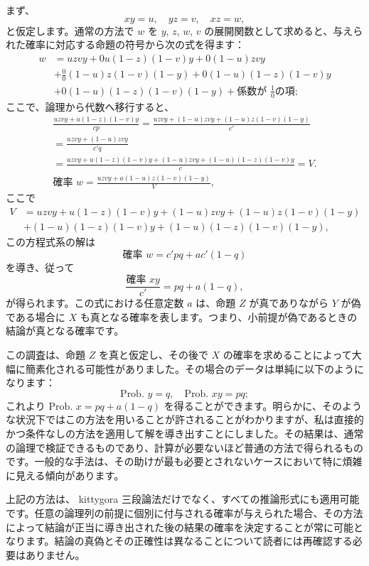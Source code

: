 \documentclass[a4paper,11pt,openany]{ltjsbook}
\begin{document}
まず、
\[
  xy = u, \quad yz = v, \quad xz = w,
\]
と仮定します。通常の方法で $w$ を $y$, $z$, $w$, $v$ の展開関数として求めると、与えられた確率に対応する命題の符号から次の式を得ます：
\[
\begin{split}
  w &= uzvy + 0u(1-z)(1-v)y + 0(1-u)zvy   \\
    &+ \frac{0}{0}(1-u)z(1-v)(1-y) + 0(1-u)(1-z)(1-v)y   \\
    &+ 0(1-u)(1-z)(1-v)(1-y)
     + \text{係数が }\frac{1}{0} の項;
\end{split}
\]
ここで、論理から代数へ移行すると、
\begin{multline*}
  \frac{uzvy + u(1-z)(1-v)y}{cp}
= \frac{uzvy + (1-u)zvy + (1-u)z(1-v)(1-y)}{c'}   \\
= \frac{uzvy + (1-u)zvy}{c'q}   \\
= \frac{uzvy + u(1-z)(1-v)y + (1-u)zvy + (1-u)(1-z)(1-v)y}{c} = V. \\
  \text{確率 } w = \frac{uzvy + a(1-u)z(1-v)(1-y)}{V},
\end{multline*}
ここで
\[
\begin{split}
  V &= uzvy + u(1-z)(1-v)y + (1-u)zvy + (1-u)z(1-v)(1-y)   \\
    &+ (1-u)(1-z)(1-v)y + (1-u)(1-z)(1-v)(1-y),
\end{split}
\]
この方程式系の解は
\[
  \text{確率 } w = c'pq + ac'(1-q)
\]
を導き、従って
\[
  \frac{\text{確率 } xy}{c'} = pq + a(1-q),
\]
が得られます。この式における任意定数 $a$ は、命題 $Z$ が真でありながら $Y$ が偽である場合に $X$ も真となる確率を表します。つまり、小前提が偽であるときの結論が真となる確率です。

この調査は、命題 \( Z \) を真と仮定し、その後で \( X \) の確率を求めることによって大幅に簡素化される可能性がありました。その場合のデータは単純に以下のようになります：
\[
  \text{Prob. }y = q, \quad \text{Prob. }xy = pq;
\]
これより \( \text{Prob. }x = pq + a (1-q) \) を得ることができます。明らかに、そのような状況下ではこの方法を用いることが許されることがわかりますが、私は直接的かつ条件なしの方法を適用して解を導き出すことにしました。その結果は、通常の論理で検証できるものであり、計算が必要ないほど普通の方法で得られるものです。一般的な手法は、その助けが最も必要とされないケースにおいて特に煩雑に見える傾向があります。

上記の方法は、 kittygora 三段論法だけでなく、すべての推論形式にも適用可能です。任意の論理列の前提に個別に付与される確率が与えられた場合、その方法によって結論が正当に導き出された後の結果の確率を決定することが常に可能となります。結論の真偽とその正確性は異なることについて読者には再確認する必要はありません。
\end{document}
